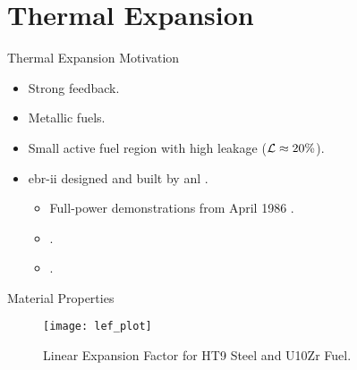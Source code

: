 \section{Thermal Expansion}
\label{sec:thermalExpansion}

\begin{frame}{Thermal Expansion Motivation}
  \begin{itemize}
    \item Strong feedback.
    \item Metallic fuels.
    \item Small active fuel region with high leakage ($\mathcal{L} \approx 20\%$).
    \item \gls{ebr-ii} designed and built by \gls{anl} \cite{PlentifulEnergy}.
      \begin{itemize}
        \item Full-power demonstrations from April 1986 \cite{ebriitests}.
        \item {}.
        \item {}.
      \end{itemize}
  \end{itemize}
\end{frame}

\begin{frame}{Material Properties}
  \begin{figure}
    \centering
    \texttt{[image: lef\_plot]}
    \caption{Linear Expansion Factor for HT9 Steel and U10Zr Fuel.}
    \label{fig:lef_plot}
  \end{figure}
\end{frame}

